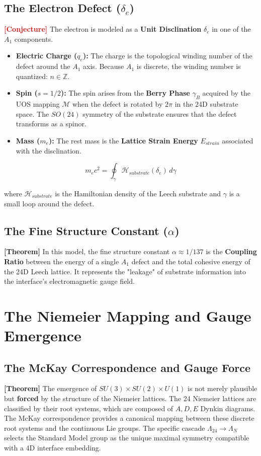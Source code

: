 \documentclass[11pt,titlepage]{article}
\newcommand{\leech}{\Lambda_{24}}
\newcommand{\tagtheo}{\textcolor{green!60!black}{\textbf{[Theorem]}} }
\newcommand{\tagconj}{\textcolor{red}{\textbf{[Conjecture]}} }
\begin{document}
\subsection{The Electron Defect ($\delta_e$)}
\tagconj The electron is modeled as a \textbf{Unit Disclination} $\delta_e$ in one of the $A_1$ components. 
\begin{itemize}
    
\item \textbf{Electric Charge ($q_e$):} The charge is the topological winding number of the defect around the $A_1$ axis. Because $A_1$ is discrete, the winding number is quantized: $n \in \mathbb{Z}$.
    
\item \textbf{Spin ($s=1/2$):} The spin arises from the \textbf{Berry Phase} $\gamma_B$ acquired by the UOS mapping $\mathcal{M}$ when the defect is rotated by $2\pi$ in the 24D substrate space. The $SO(24)$ symmetry of the substrate ensures that the defect transforms as a spinor.
    
\item \textbf{Mass ($m_e$):} The rest mass is the \textbf{Lattice Strain Energy} $E_{strain}$ associated with the disclination.
\end{itemize}

\begin{equation}
m_e c^2 = \oint_{\gamma} \mathcal{H}_{substrate}(\delta_e) \, d\gamma
\end{equation}

where $\mathcal{H}_{substrate}$ is the Hamiltonian density of the Leech substrate and $\gamma$ is a small loop around the defect.

\subsection{The Fine Structure Constant ($\alpha$)}
\tagtheo In this model, the fine structure constant $\alpha \approx 1/137$ is the \textbf{Coupling Ratio} between the energy of a single $A_1$ defect and the total cohesive energy of the 24D Leech lattice. It represents the "leakage" of substrate information into the interface's electromagnetic gauge field.

\section{The Niemeier Mapping and Gauge Emergence}
\subsection{The McKay Correspondence and Gauge Force}
\tagtheo The emergence of $SU(3) \times SU(2) \times U(1)$ is not merely plausible but \textbf{forced} by the structure of the Niemeier lattices. The 24 Niemeier lattices are classified by their root systems, which are composed of $A, D, E$ Dynkin diagrams. The McKay correspondence provides a canonical mapping between these discrete root systems and the continuous Lie groups. The specific cascade $\leech \to \Lambda_N$ selects the Standard Model group as the unique maximal symmetry compatible with a 4D interface embedding.
\end{document}

